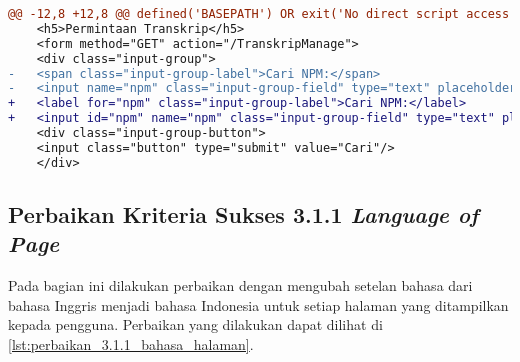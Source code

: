 \begin{lstlisting}[frame=single, label={lst:perbaikan_2.5.3_label_dan_nama_pada_komponen_masukan}, language=diff, caption=Perbaikan Kriteria Sukses 2.5.3 - Label dan Nama Pada Komponen Masukan]
@@ -12,8 +12,8 @@ defined('BASEPATH') OR exit('No direct script access allowed');
    <h5>Permintaan Transkrip</h5>
    <form method="GET" action="/TranskripManage">
    <div class="input-group">
-   <span class="input-group-label">Cari NPM:</span>
-   <input name="npm" class="input-group-field" type="text" placeholder="2013730013" maxlength="10" minlength="10"<?= $npmQuery === NULL ? '' : " value='$npmQuery'" ?>/>
+   <label for="npm" class="input-group-label">Cari NPM:</label>
+   <input id="npm" name="npm" class="input-group-field" type="text" placeholder="2013730013" maxlength="10" minlength="10"<?= $npmQuery === NULL ? '' : " value='$npmQuery'" ?>/>
    <div class="input-group-button">
    <input class="button" type="submit" value="Cari"/>
    </div>
\end{lstlisting} 

\subsection{Perbaikan Kriteria Sukses 3.1.1 \textit{Language of Page}}
\label{subsec:perbaikan_kriteria_sukses_3.1.1}
Pada bagian ini dilakukan perbaikan dengan mengubah setelan bahasa dari bahasa Inggris menjadi bahasa Indonesia untuk setiap halaman yang ditampilkan kepada pengguna. Perbaikan yang dilakukan dapat dilihat di \ref{lst:perbaikan_3.1.1_bahasa_halaman}.

